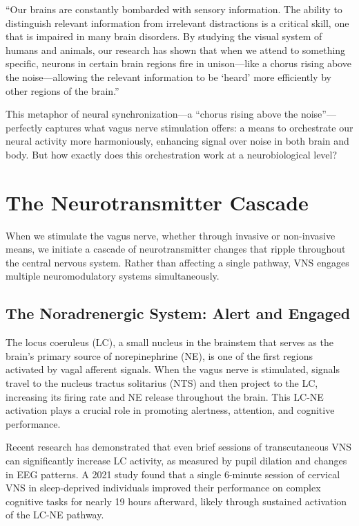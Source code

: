 \documentclass[
  Letterpaper,
]{scrbook}
\begin{document}
``Our brains are constantly bombarded with sensory information. The
ability to distinguish relevant information from irrelevant distractions
is a critical skill, one that is impaired in many brain disorders. By
studying the visual system of humans and animals, our research has shown
that when we attend to something specific, neurons in certain brain
regions fire in unison---like a chorus rising above the noise---allowing
the relevant information to be `heard' more efficiently by other regions
of the brain.''

This metaphor of neural synchronization---a ``chorus rising above the
noise''---perfectly captures what vagus nerve stimulation offers: a
means to orchestrate our neural activity more harmoniously, enhancing
signal over noise in both brain and body. But how exactly does this
orchestration work at a neurobiological level?

\section{The Neurotransmitter
Cascade}\label{the-neurotransmitter-cascade}

When we stimulate the vagus nerve, whether through invasive or
non-invasive means, we initiate a cascade of neurotransmitter changes
that ripple throughout the central nervous system. Rather than affecting
a single pathway, VNS engages multiple neuromodulatory systems
simultaneously.

\subsection{The Noradrenergic System: Alert and
Engaged}\label{the-noradrenergic-system-alert-and-engaged}

The locus coeruleus (LC), a small nucleus in the brainstem that serves
as the brain's primary source of norepinephrine (NE), is one of the
first regions activated by vagal afferent signals. When the vagus nerve
is stimulated, signals travel to the nucleus tractus solitarius (NTS)
and then project to the LC, increasing its firing rate and NE release
throughout the brain. This LC-NE activation plays a crucial role in
promoting alertness, attention, and cognitive performance.

Recent research has demonstrated that even brief sessions of
transcutaneous VNS can significantly increase LC activity, as measured
by pupil dilation and changes in EEG patterns. A 2021 study found that a
single 6-minute session of cervical VNS in sleep-deprived individuals
improved their performance on complex cognitive tasks for nearly 19
hours afterward, likely through sustained activation of the LC-NE
pathway.
\end{document}
